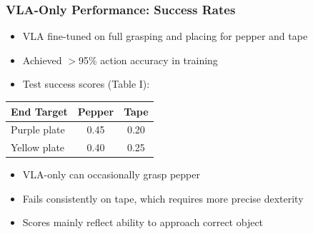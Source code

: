 \documentclass{beamer}
\begin{document}
\begin{frame}
  \frametitle{VLA-Only Performance: Success Rates}
  \small
  \begin{itemize}
    \item VLA fine-tuned on full grasping and placing for pepper and tape
    \item Achieved $>$95\% action accuracy in training
    \item Test success scores (Table I):
  \end{itemize}
  \vspace{0.2cm}
  \centering
  \small
  \begin{tabular}{lcc}
    \toprule
    End Target & Pepper & Tape \\
    \midrule
    Purple plate & 0.45 & 0.20 \\
    Yellow plate & 0.40 & 0.25 \\
    \bottomrule
  \end{tabular}
  \vspace{0.2cm}

  \small
  \begin{itemize}
    \item VLA-only can occasionally grasp pepper
    \item Fails consistently on tape, which requires more precise dexterity
    \item Scores mainly reflect ability to approach correct object
  \end{itemize}
\end{frame}
\end{document}
